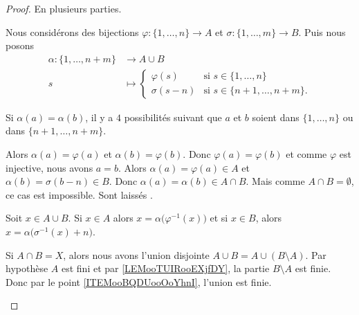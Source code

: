 \begin{proof}
	En plusieurs parties.
	\begin{subproof}
		Nous considérons des bijections \(\varphi \colon \{ 1,\ldots,n \}\to A  \) et \(\sigma \colon \{ 1,\ldots,m \}\to B  \). Puis nous posons
		\begin{equation}
			\begin{aligned}
				\alpha\colon \{ 1,\ldots,n+m \} & \to A\cup B                                               \\
				s                               & \mapsto \begin{cases}
					                                          \varphi(s)  & \text{si } s\in\{ 1,\ldots,n \}     \\
					                                          \sigma(s-n) & \text{si }s\in\{ n+1,\ldots,n+m \}.
				                                          \end{cases}
			\end{aligned}
		\end{equation}
		\begin{subproof}
			Si \( \alpha(a)=\alpha(b)\), il y a \( 4\) possibilités suivant que \( a\) et \( b\) soient dans \( \{ 1,\ldots,n \}\) ou dans \( \{ n+1,\ldots,n+m \}\).
			\begin{subproof}
				\spitem[Si \( a,b\in\{ 1,\ldots,n \}\)]
				Alors \( \alpha(a)=\varphi(a)\) et \( \alpha(b)=\varphi(b)\). Donc \( \varphi(a)=\varphi(b)\) et comme \( \varphi\) est injective, nous avons \( a=b\).
				Alors \( \alpha(a)=\varphi(a)\in A\) et \( \alpha(b)=\sigma(b-n)\in B\). Donc \( \alpha(a)=\alpha(b)\in A\cap B\). Mais comme \( A\cap B=\emptyset\), ce cas est impossible.
				Sont laissés .
			\end{subproof}
			Soit \( x\in A\cup B\). Si \( x\in A\) alors \( x=\alpha\big( \varphi^{-1}(x) \big)\) et si \( x\in B\), alors \( x=\alpha\big( \sigma^{-1}(x)+n \big)\).
		\end{subproof}
		Si \( A\cap B=X\), alors nous avons l'union disjointe \( A\cup B=A\cup(B\setminus A)\). Par hypothèse \( A\) est fini et par \ref{LEMooTUIRooEXjfDY}, la partie \( B\setminus A\) est finie. Donc par le point \ref{ITEMooBQDUooOoYhnI}, l'union est finie.


\end{subproof}
\end{proof}
